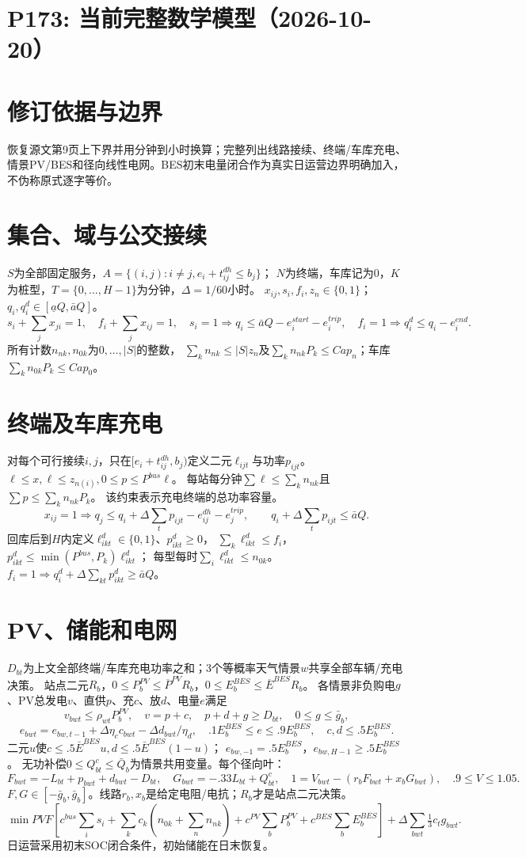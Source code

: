 \documentclass[11pt]{ctexart}
\begin{document}
\section*{P173: 当前完整数学模型（2026-10-20）}
\section*{修订依据与边界}恢复源文第9页上下界并用分钟到小时换算；完整列出线路接续、终端/车库充电、情景PV/BES和径向线性电网。BES初末电量闭合作为真实日运营边界明确加入，不伪称原式逐字等价。

\section*{集合、域与公交接续}
$S$为全部固定服务，$A=\{(i,j):i\ne j,e_i+t^{dh}_{ij}\le b_j\}$；
$N$为终端，车库记为0，$K$为桩型，$T=\{0,\ldots,H-1\}$为分钟，$\Delta=1/60$小时。
$x_{ij},s_i,f_i,z_n\in\{0,1\}$；$q_i,q^d_i\in[\underline a Q,\bar a Q]$。
\[
s_i+\sum_jx_{ji}=1,\quad f_i+\sum_jx_{ij}=1,\quad
s_i=1\Rightarrow q_i\le\bar aQ-e_i^{start}-e_i^{trip},
\quad f_i=1\Rightarrow q_i^d\le q_i-e_i^{end}.
\]
所有计数$n_{nk},n_{0k}$为$0,\ldots,|S|$的整数，
$\sum_kn_{nk}\le|S|z_n$及$\sum_kn_{nk}P_k\le Cap_n$；车库$\sum_kn_{0k}P_k\le Cap_0$。
\section*{终端及车库充电}
对每个可行接续$i,j$，只在$[e_i+t^{dh}_{ij},b_j)$定义二元$\ell_{ijt}$与功率$p_{ijt}$。
$\ell\le x,\ell\le z_{n(i)},0\le p\le P^{bus}\ell$。
每站每分钟$\sum\ell\le\sum_kn_{nk}$且$\sum p\le\sum_kn_{nk}P_k$。
该约束表示充电终端的总功率容量。
\[
x_{ij}=1\Rightarrow
q_j\le q_i+\Delta\sum_tp_{ijt}-e^{dh}_{ij}-e_j^{trip},\qquad
q_i+\Delta\sum_tp_{ijt}\le\bar aQ.
\]
回库后到$H$内定义$\ell^d_{ikt}\in\{0,1\}$、$p^d_{ikt}\ge0$，
$\sum_k\ell^d_{ikt}\le f_i$，$p^d_{ikt}\le\min(P^{bus},P_k)\ell^d_{ikt}$；
每型每时$\sum_i\ell^d_{ikt}\le n_{0k}$。
$f_i=1\Rightarrow q_i^d+\Delta\sum_{kt}p^d_{ikt}\ge\bar aQ$。
\section*{PV、储能和电网}
$D_{bt}$为上文全部终端/车库充电功率之和；3个等概率天气情景$w$共享全部车辆/充电决策。
站点二元$R_b$，$0\le P_b^{PV}\le\overline P^{PV}R_b$，$0\le E_b^{BES}\le\overline E^{BES}R_b$。
各情景非负购电$g$、PV总发电$v$、直供$p$、充$c$、放$d$、电量$e$满足
\[
v_{bwt}\le\rho_{wt}P_b^{PV},\quad v=p+c,\quad p+d+g\ge D_{bt},\quad0\le g\le\bar g_b,
\]
\[
e_{bwt}=e_{bw,t-1}+\Delta\eta_c c_{bwt}-\Delta d_{bwt}/\eta_d,\quad
.1E_b^{BES}\le e\le.9E_b^{BES},\quad c,d\le.5E_b^{BES}.
\]
二元$u$使$c\le.5\bar E^{BES}u,d\le.5\bar E^{BES}(1-u)$；
$e_{bw,-1}=.5E_b^{BES}$，$e_{bw,H-1}\ge.5E_b^{BES}$。
无功补偿$0\le Q^c_{bt}\le\bar Q_b$为情景共用变量。每个径向叶：
\[
F_{bwt}=-L_{bt}+p_{bwt}+d_{bwt}-D_{bt},\quad
G_{bwt}=-.33L_{bt}+Q^c_{bt},\quad
1=V_{bwt}-(r_bF_{bwt}+x_bG_{bwt}),\quad .9\le V\le1.05.
\]
$F,G\in[-\bar g_b,\bar g_b]$。线路$r_b,x_b$是给定电阻/电抗；$R_b$才是站点二元决策。
\[
\min PVF[c^{bus}\sum_is_i+\sum_kc_k(n_{0k}+\sum_nn_{nk})+
c^{PV}\sum_bP_b^{PV}+c^{BES}\sum_bE_b^{BES}]
+\Delta\sum_{bwt}\tfrac13c_tg_{bwt}.
\]
日运营采用初末SOC闭合条件，初始储能在日末恢复。
\end{document}

